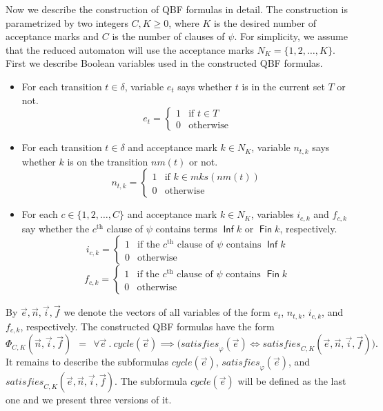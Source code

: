 \documentclass[a4paper,UKenglish,cleveref, autoref, thm-restate]{lipics-v2021}
\DeclareMathOperator{\Inf}{\mathsf{Inf}}
\DeclareMathOperator{\Fin}{\mathsf{Fin}}
\newcommand{\mks}{\mathit{mks}}
\newcommand{\rem}{\mathit{nm}}
\newcommand{\mcycle}{\mathit{cycle}}
\newcommand{\msat}{\mathit{satisfies}}
\begin{document}
Now we describe the construction of QBF formulas in detail. The
construction is parametrized by two integers $C,K\ge 0$, where $K$ is
the desired number of acceptance marks and $C$ is the number of
clauses of $\psi$. For simplicity, we assume that the reduced
automaton will use the acceptance marks $N_K=\{1,2,\ldots,K\}$.
First we describe Boolean variables used in the constructed QBF
formulas.
\begin{itemize}
\item For each transition $t\in\delta$, variable $e_t$ says whether
  $t$ is in the current set $T$ or not.
  \[e_t=\left\{
      \begin{array}{ll}
        1 & \textrm{if }t\in T\\
        0 & \textrm{otherwise}    
      \end{array}\right.
  \]
\item For each transition $t\in\delta$ and acceptance mark $k\in N_K$,
  variable $n_{t,k}$ says whether $k$ is on the transition
  $\rem(t)$ or not.
  \[n_{t,k}=\left\{
      \begin{array}{ll}
        1 & \textrm{if }k\in\mks(\rem(t))\\
        0 & \textrm{otherwise}    
      \end{array}\right.
  \]
\item For each $c\in\{1,2,\ldots,C\}$ and acceptance mark $k\in N_K$,
  variables $i_{c,k}$ and $f_{c,k}$ say whether the $c^\textrm{th}$
  clause of $\psi$ contains terms $\Inf k$ or $\Fin k$, respectively.
  \[i_{c,k}=\left\{
      \begin{array}{ll}
        1 & \textrm{if the $c^\textrm{th}$ clause of $\psi$ contains $\Inf k$}\\
        0 & \textrm{otherwise}    
      \end{array}\right.
  \]
  \[f_{c,k}=\left\{
      \begin{array}{ll}
        1 & \textrm{if the $c^\textrm{th}$ clause of $\psi$ contains $\Fin k$}\\
        0 & \textrm{otherwise}    
      \end{array}\right.
  \]

\end{itemize}
By $\vec{e},\vec{n},\vec{i},\vec{f}$ we denote the vectors of all
variables of the form $e_t$, $n_{t,k}$, $i_{c,k}$, and $f_{c,k}$,
respectively. The constructed QBF formulas have the form 
\[
  \Phi_{C,K}(\vec{n},\vec{i},\vec{f})~~=~~\forall \vec{e}~.~\mcycle(\vec{e})\implies\big(\msat_\varphi(\vec{e}) \iff \msat_{C,K}(\vec{e},\vec{n},\vec{i},\vec{f})\big).
\]
It remains to describe the subformulas $\mcycle(\vec{e})$,
$\msat_\varphi(\vec{e})$, and
$\msat_{C,K}(\vec{e},\vec{n},\vec{i},\vec{f})$. The subformula
$\mcycle(\vec{e})$ will be defined as the last one and we present
three versions of it.
\end{document}
